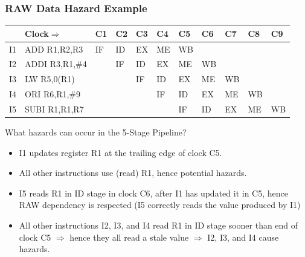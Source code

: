 \documentclass{beamer}
\renewcommand{\emph}[1]{\textcolor{structure}{#1}}
\begin{document}
\begin{frame}[fragile,t]
\frametitle{RAW Data Hazard Example}

\bigskip

\begin{scriptsize}
\begin{tabular}{lllllllllll}
\hline
   & Clock$\Rightarrow$ & C1 & C2 & C3 & C4 & C5 & C6 & C7 & C8 & C9 \\\hline
I1 & ADD  R1,R2,R3      & IF & ID & EX & ME & WB &    &    &    &    \\
I2 & ADDI R3,R1,\#4     &    & IF & ID & EX & ME & WB &    &    &    \\
I3 & LW   R5,0(R1)      &    &    & IF & ID & EX & ME & WB &    &    \\
I4 & ORI  R6,R1,\#9     &    &    &    & IF & ID & EX & ME & WB &    \\
I5 & SUBI R1,R1,R7      &    &    &    &    & IF & ID & EX & ME & WB \\\hline
\end{tabular}
\end{scriptsize} 

\bigskip

\begin{scriptsize}
What hazards can occur in the 5-Stage Pipeline?
\begin{itemize}
\item I1 updates register R1 at the trailing edge of clock C5. \smallskip
\item All other instructions use (read) R1, hence potential hazards.
\item I5 reads R1 in ID stage in clock C6, after I1 has updated it in C5,
            hence RAW dependency is respected (\emph{I5 correctly reads the
            value produced by I1})\smallskip
\item All other instructions I2, I3, and I4 read R1 in ID stage sooner than
            end of clock C5 $\Rightarrow$ hence they all read a stale value 
            $\Rightarrow$ \alert{I2, I3, and I4 cause hazards}. 
\end{itemize}
\end{scriptsize}

\end{frame}
\end{document}
